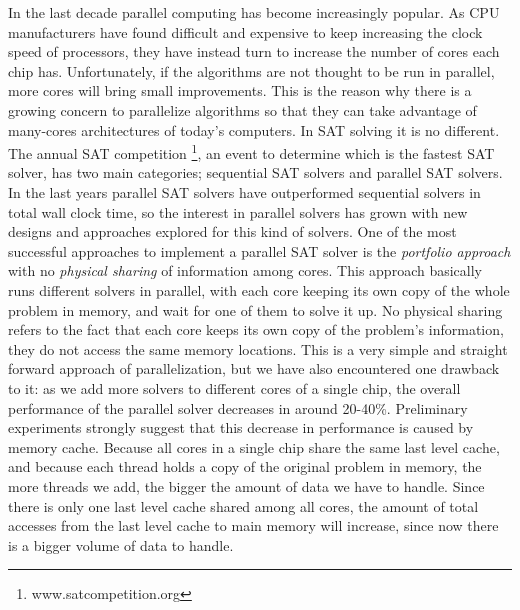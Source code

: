 \documentclass[12pt]{diicc}
\begin{document}
In the last decade parallel computing has become increasingly popular. As CPU manufacturers have found difficult and expensive to keep increasing the clock speed of processors, they have instead turn to increase the number of cores each chip has. Unfortunately, if the algorithms are not thought to be run in parallel, more cores will bring small improvements. This is the reason why there is a growing concern to parallelize algorithms so that they can take advantage of many-cores architectures of today's computers. In SAT solving it is no different. The annual SAT competition \footnote[1]{www.satcompetition.org}, an event to determine which is the fastest SAT solver, has two main categories; sequential SAT solvers and parallel SAT solvers. In the last years parallel SAT solvers have outperformed sequential solvers in total wall clock time, so the interest in parallel solvers has grown with new designs and approaches explored for this kind of solvers. One of the most successful approaches to implement a parallel SAT solver is the \textit{portfolio approach} with no \textit{physical sharing} of information among cores. This approach basically runs different solvers in parallel, with each core keeping its own copy of the whole problem in memory, and wait for one of them to solve it up. No physical sharing refers to the fact that each core keeps its own copy of the problem's information, they do not access the same memory locations. This is a very simple and straight forward approach of parallelization, but we have also encountered one drawback to it: as we add more solvers to different cores of a single chip, the overall performance of the parallel solver decreases in around 20-40\%. Preliminary experiments strongly suggest that this decrease in performance is caused by memory cache. Because all cores in a single chip share the same last level cache, and because each thread holds a copy of the original problem in memory, the more threads we add, the bigger the amount of data we have to handle. Since there is only one last level cache shared among all cores, the amount of total accesses from the last level cache to main memory will increase, since now there is a bigger volume of data to handle. 
\end{document}
